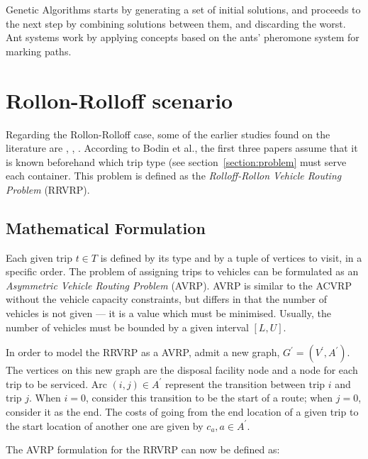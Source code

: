 Genetic Algorithms starts by generating a set of initial solutions, and
proceeds to the next step by combining solutions between them, and discarding
the worst. Ant systems work by applying concepts based on the ants' pheromone
system for marking paths\citep{Colorni91}.







\section{Rollon-Rolloff scenario}
\label{section:rrvrp}

Regarding the Rollon-Rolloff case, some of the earlier studies found on the
literature are \citet{Cristallo94}, \citet{Meulemeester97}, \citet{Bodin00}.
According to Bodin et al., the first three papers assume that it is known
beforehand which trip type (see section~\ref{section:problem} must serve each
container. This problem is defined as the \textit{Rolloff-Rollon Vehicle
Routing Problem} (RRVRP).

\subsection{Mathematical Formulation}

Each given trip $t \in T$ is defined by its type and by a tuple of vertices to
visit, in a specific order. The problem of assigning trips to vehicles can be
formulated as an \textit{Asymmetric Vehicle Routing Problem} (AVRP). AVRP is
similar to the ACVRP without the vehicle capacity constraints, but differs in
that the number of vehicles is not given --- it is a value which must be
minimised. Usually, the number of vehicles must be bounded by a given interval
$[L, U]$.

In order to model the RRVRP as a AVRP, admit a new graph, $G^\prime =
(V^\prime, A^\prime)$. The vertices on this new graph are the disposal facility
node and a node for each trip to be serviced. Arc $(i, j) \in A^\prime$
represent the transition between trip $i$ and trip $j$. When $i = 0$, 
consider this transition to be the start of a route; when $j = 0$, consider
it as the end. The costs of going from the end location of a given trip to the
start location of another one are given by $c_{a}, a \in A^\prime$.

The AVRP formulation for the RRVRP can now be defined as:

